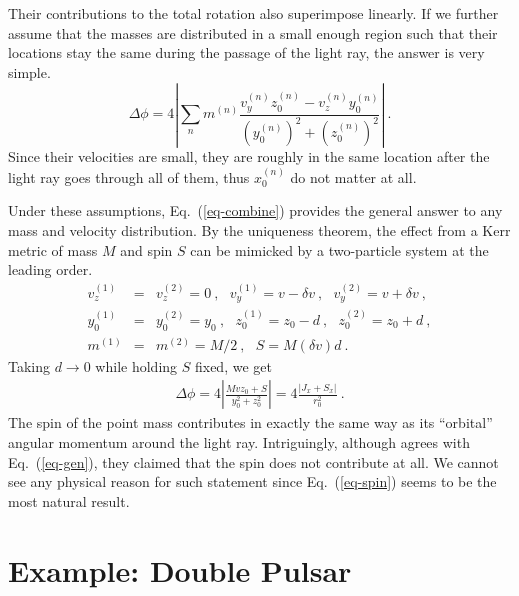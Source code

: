 \documentclass[aps,showpacs,twocolumn,floats,prd,superscriptaddress,nofootinbib]{revtex4-1}
\begin{document}
Their contributions to the total rotation also superimpose linearly. 
If we further assume that the masses are distributed in a small enough region such that their locations stay the same during the passage of the light ray, the answer is very simple. 
\begin{equation}
\Delta\phi = 4 \left| \sum_n m^{(n)} \frac{v_y^{(n)}z_0^{(n)} - v_z^{(n)}y_0^{(n)}}
{\left(y_0^{(n)}\right)^2+\left(z_0^{(n)}\right)^2} \right|~.
\label{eq-combine}
\end{equation}
Since their velocities are small, they are roughly in the same location after the light ray goes through all of them, thus $x_0^{(n)}$ do not matter at all. 

Under these assumptions, Eq.~(\ref{eq-combine}) provides the general answer to any mass and velocity distribution. 
By the uniqueness theorem, the effect from a Kerr metric of mass $M$ and spin $S$ can be mimicked by a two-particle system at the leading order.
\begin{eqnarray}
v_z^{(1)} &=& v_z^{(2)} = 0~,  \ \ \ v_y^{(1)} = v -\delta v~, \ \ \ v_y^{(2)} = v + \delta v~, \nonumber \\
y_0^{(1)} &=& y_0^{(2)} = y_0~, \ \ \ z_0^{(1)} = z_0-d~, \ \ \ z_0^{(2)} = z_0 + d~, \nonumber \\
m^{(1)} &=& m^{(2)} = M/2~, \ \ \ S = M (\delta v) d~. 
\end{eqnarray}
Taking $d\rightarrow0$ while holding $S$ fixed, we get
\begin{eqnarray}
\Delta \phi = 4\left|\frac{Mvz_0 + S}{y_0^2 + z_0^2}\right| = 4 \frac{\left| J_x + S_x \right|}{r_0^2}~.
\label{eq-spin}
\end{eqnarray}
The spin of the point mass contributes in exactly the same way as its ``orbital'' angular momentum around the light ray. Intriguingly, although \cite{KopMas01} agrees with Eq.~(\ref{eq-gen}), they claimed that the spin does not contribute at all. We cannot see any physical reason for such statement since Eq.~(\ref{eq-spin}) seems to be the most natural result.









\section{Example: Double Pulsar}
\label{sec-prediction}
\end{document}
